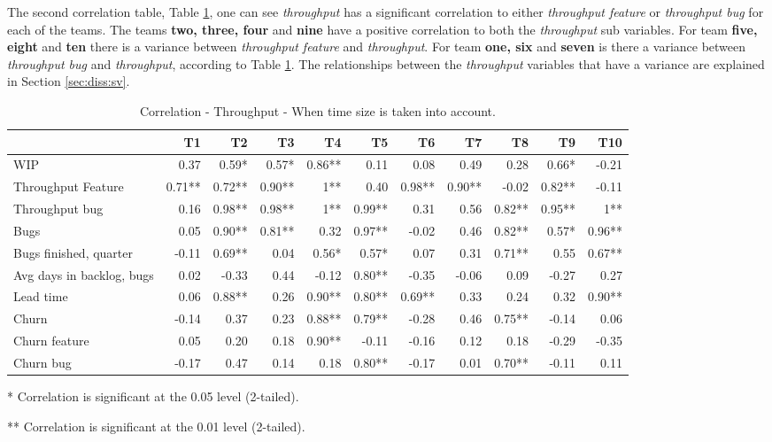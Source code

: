 \documentclass[UKenglish]{ifimaster}  %
\begin{document}
The second correlation table, Table \ref{corr:TP:V2}, one can see \textit{throughput} has a significant correlation to either \textit{throughput feature} or \textit{throughput bug} for each of the teams. The teams \textbf{two, three, four} and \textbf{nine} have a positive correlation to both the \textit{throughput} sub variables. For team \textbf{five, eight} and \textbf{ten} there is a variance between \textit{throughput feature} and \textit{throughput}.  For team \textbf{one, six} and \textbf{seven} is there a variance between \textit{throughput bug} and \textit{throughput}, according to Table \ref{corr:TP:V2}. The relationships between the \textit{throughput} variables that have a variance are explained in Section \ref{sec:diss:sv}.


 \begin{table}[!htbp]
  \begin{adjustwidth}{-2.5cm}{}
 \centering
 \begin{tabular}{|l|r|r|r|r|r|r|r|r|r|r|}
\hline
 & \bf{T1} & \bf{T2} & \bf{T3} & \bf{T4} & \bf{T5} & \bf{T6} & \bf{T7} & \bf{T8} & \bf{T9} & \bf{T10}\\ \hline
 WIP  & 0.37 & 0.59* & 0.57* & 0.86** & 0.11 & 0.08 & 0.49 & 0.28 & 0.66* & -0.21 \\ \hline
 Throughput Feature  & 0.71** & 0.72** & 0.90** & 1** & 0.40 & 0.98** & 0.90** & -0.02 & 0.82** & -0.11 \\ \hline
 Throughput bug  & 0.16 & 0.98** & 0.98** & 1** & 0.99** & 0.31 & 0.56 & 0.82** & 0.95** & 1** \\ \hline
 Bugs  & 0.05 & 0.90** & 0.81** & 0.32 & 0.97** & -0.02 & 0.46 & 0.82** & 0.57* & 0.96** \\ \hline
 Bugs finished, quarter  & -0.11 & 0.69** & 0.04 & 0.56* & 0.57* & 0.07 & 0.31 & 0.71** & 0.55 & 0.67** \\ \hline
 Avg days in backlog, bugs  & 0.02 & -0.33 & 0.44 & -0.12 & 0.80** & -0.35 & -0.06 & 0.09 & -0.27 & 0.27 \\ \hline
 Lead time  & 0.06 & 0.88** & 0.26 & 0.90** & 0.80** & 0.69** & 0.33 & 0.24 & 0.32 & 0.90** \\ \hline
 Churn  & -0.14 & 0.37 & 0.23 & 0.88** & 0.79** & -0.28 & 0.46 & 0.75** & -0.14 & 0.06 \\ \hline
 Churn feature  & 0.05 & 0.20 & 0.18 & 0.90** & -0.11 & -0.16 & 0.12 & 0.18 & -0.29 & -0.35 \\ \hline
 Churn bug  & -0.17 & 0.47 & 0.14 & 0.18 & 0.80** & -0.17 & 0.01 & 0.70** & -0.11 & 0.11 \\ \hline
\end{tabular}
 \caption{Correlation - Throughput - When time size is taken into account.}
 \label{corr:TP:V2}
 \centerline {* Correlation is significant at the 0.05 level (2-tailed).}
\centerline{** Correlation is significant at the 0.01 level (2-tailed).}
\end{adjustwidth}
\end{table}
\newpage 
 
\end{document}
